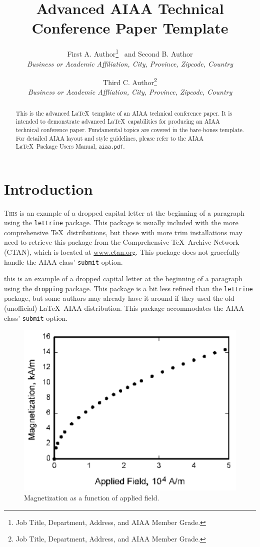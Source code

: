 \documentclass[]{aiaa-tc}%
\title{Advanced AIAA Technical Conference Paper Template}
\author{
  First A. Author\thanks{Job Title, Department, Address, and AIAA Member Grade.}
  \ and Second B. Author\thanksibid{1}\\
  {\normalsize\itshape
   Business or Academic Affiliation, City, Province, Zipcode, Country}\\
  \and
  Third C. Author\thanks{Job Title, Department, Address,
                         and AIAA Member Grade.}\\
  {\normalsize\itshape
  Business or Academic Affliation, City, Province, Zipcode, Country}
 }
\newcommand{\package}[1]{\texttt{#1}}
\newcommand{\file}[1]{\texttt{#1}}
\begin{document}
\maketitle

\begin{abstract}
This is the advanced \LaTeX\ template of an AIAA technical conference paper.
It is intended to demonstrate advanced \LaTeX\ capabilities for
producing an AIAA technical conference paper.
Fundamental topics are covered in the bare-bones template.
For detailed AIAA layout and style guidelines, please refer to the AIAA
\LaTeX\ Package Users Manual, \file{aiaa.pdf}.
\end{abstract}

\printglossary

\section{Introduction}

\lettrine[nindent=0pt]{T}{his} is an example of a dropped capital letter
at the beginning of a paragraph using the \package{lettrine} package.
This package is usually included with the more comprehensive \TeX\
distributions, but those with more trim installations may need to
retrieve this package from the Comprehensive \TeX\ Archive Network
(CTAN), which is located at \href{http://www.ctan.org}{www.ctan.org}.
This package does not gracefully handle the AIAA class' \verb|submit|
option.

 this is an example of a dropped capital
letter at the beginning of a paragraph using the \package{dropping}
package.
This package is a bit less refined than the \package{lettrine} package,
but some authors may already have it around if they used the old
(unofficial) \LaTeX\ AIAA distribution.
This package accommodates the AIAA class' \verb|submit| option.

\begin{figure}
 \includegraphics{figure_magnet}
 \caption{Magnetization as a function of applied field.}
 \label{f:magnetic_field}
\end{figure}
\end{document}
